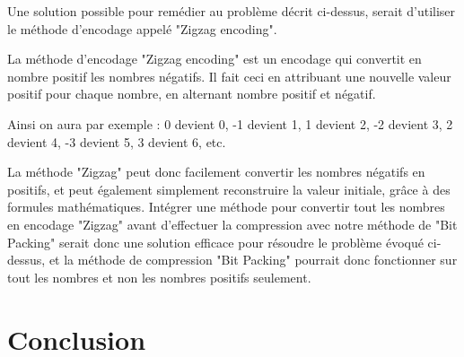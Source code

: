 \documentclass[titlepage]{article}
\begin{document}
Une solution possible pour remédier au problème décrit ci-dessus, serait d'utiliser le méthode d'encodage appelé "Zigzag encoding".
\par La méthode d'encodage "Zigzag encoding" est un encodage qui convertit en nombre positif les nombres négatifs. Il fait ceci en attribuant une nouvelle valeur positif pour chaque nombre, en alternant nombre positif et négatif.
\par Ainsi on aura par exemple : 0 devient 0, -1 devient 1, 1 devient 2, -2 devient 3, 2 devient 4, -3 devient 5, 3 devient 6, etc.
\par La méthode "Zigzag" peut donc facilement convertir les nombres négatifs en positifs, et peut également simplement reconstruire la valeur initiale, grâce à des formules mathématiques. Intégrer une méthode pour convertir tout les nombres en encodage "Zigzag" avant d'effectuer la compression avec notre méthode de "Bit Packing" serait donc une solution efficace pour résoudre le problème évoqué ci-dessus, et la méthode de compression "Bit Packing" pourrait donc fonctionner sur tout les nombres et non les nombres positifs seulement. 

\clearpage


\section{Conclusion}


\clearpage
\end{document}
